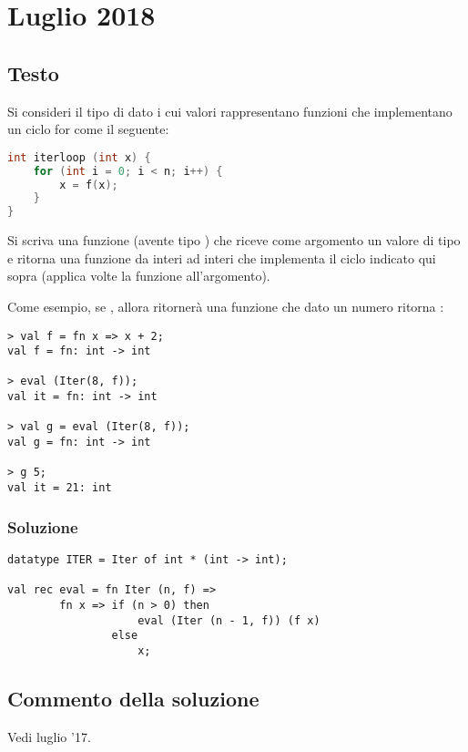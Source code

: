 \section{Luglio 2018}
\subsection{Testo}

Si consideri il tipo di dato  i cui valori  rappresentano funzioni che implementano un ciclo for come il seguente:

\begin{lstlisting}[language = C, frame = none]
int iterloop (int x) {
	for (int i = 0; i < n; i++) {
		x = f(x);
	}
}
\end{lstlisting}

Si scriva una funzione  (avente tipo ) che riceve come argomento un valore di tipo  e ritorna una funzione da interi ad interi che implementa il ciclo indicato qui sopra (applica  volte la funzione  all'argomento).

\medskip
Come esempio, se , allora  ritornerà una funzione che dato un numero  ritorna :

\begin{lstlisting}[style = SML, frame= none]
> val f = fn x => x + 2;
val f = fn: int -> int

> eval (Iter(8, f));
val it = fn: int -> int

> val g = eval (Iter(8, f));
val g = fn: int -> int

> g 5;
val it = 21: int
\end{lstlisting}

\subsubsection{Soluzione}

\begin{lstlisting}[style = SML, caption = {Definizione della funzione \sml{eval}}]
datatype ITER = Iter of int * (int -> int);

val rec eval = fn Iter (n, f) =>
		fn x => if (n > 0) then
					eval (Iter (n - 1, f)) (f x)
				else
					x;
\end{lstlisting}

\subsection{Commento della soluzione}

Vedi luglio '17.
